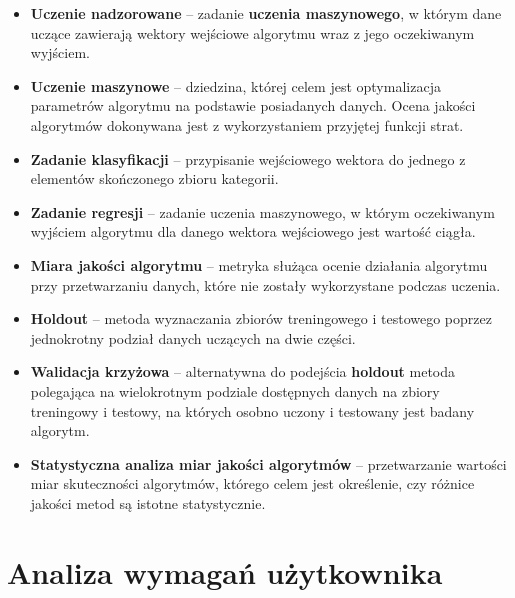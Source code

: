 \documentclass[12pt]{article}
\begin{document}
\begin{itemize}
	\item 
	\textbf{Uczenie nadzorowane} -- zadanie \textbf{uczenia maszynowego}, w którym dane uczące zawierają wektory wejściowe algorytmu wraz z jego oczekiwanym wyjściem\cite{Bishop2006}. 
	
	\item 
	\textbf{Uczenie maszynowe} -- dziedzina, której celem jest optymalizacja parametrów algorytmu na podstawie posiadanych danych. Ocena jakości algorytmów dokonywana jest z wykorzystaniem przyjętej funkcji strat.
	\cite{Alpaydin2014}
	
	\item 
	\textbf{Zadanie klasyfikacji} -- przypisanie wejściowego wektora do jednego z elementów skończonego zbioru kategorii\cite{Bishop2006}. 
	
	\item 
	\textbf{Zadanie regresji} -- zadanie uczenia maszynowego, w którym oczekiwanym wyjściem algorytmu dla danego wektora wejściowego jest wartość ciągła\cite{Bishop2006}.
	
	\item 
	\textbf{Miara jakości algorytmu} -- metryka służąca ocenie działania algorytmu przy przetwarzaniu danych, które nie zostały wykorzystane podczas uczenia.
	
	\item 
	\textbf{Holdout} -- metoda wyznaczania zbiorów treningowego i testowego poprzez jednokrotny podział danych uczących na dwie części.
	
	\item 
	\textbf{Walidacja krzyżowa} -- alternatywna do podejścia \textbf{holdout} metoda polegająca na wielokrotnym podziale dostępnych danych na zbiory treningowy i testowy, na których osobno uczony i testowany jest badany algorytm\cite{Alpaydin2014}.

	\item 
	\textbf{Statystyczna analiza miar jakości algorytmów} -- przetwarzanie wartości miar skuteczności algorytmów, którego celem jest określenie, czy różnice jakości metod są istotne statystycznie\cite{Dietterich1998}.
	
\end{itemize}




\section{Analiza wymagań użytkownika}
\end{document}
